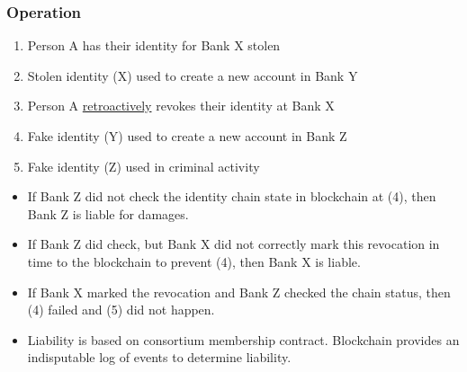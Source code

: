 \documentclass[8pt,final,xcolor={usenames,x11names}]{beamer}
\begin{document}
\begin{frame}[fragile]
\frametitle{Operation}
\begin{enumerate}
 \item Person A has their identity for \colorbox{PaleTurquoise1>wheel,1,5}{Bank X} stolen
 \item \colorbox{PaleTurquoise1>wheel,1,5}{Stolen identity (X)} used to create a new account in \colorbox{PaleTurquoise1>wheel,2,5}{Bank Y}
 \item Person A \underline{retroactively} revokes their identity at \colorbox{PaleTurquoise1>wheel,1,5}{Bank X}
 \item \colorbox{PaleTurquoise1>wheel,2,5}{Fake identity (Y)} used to create a new account in \colorbox{PaleTurquoise1}{Bank Z}
 \item \colorbox{PaleTurquoise1}{Fake identity (Z)} used in criminal activity
\end{enumerate}
\begin{itemize}
 \item If \colorbox{PaleTurquoise1}{Bank Z} did not check the identity chain state in blockchain at (4), then \colorbox{PaleTurquoise1}{Bank Z} is liable for damages.
 \item If \colorbox{PaleTurquoise1}{Bank Z} did check, but \colorbox{PaleTurquoise1>wheel,1,5}{Bank X} did not correctly mark this revocation in time to the blockchain to prevent (4), then \colorbox{PaleTurquoise1>wheel,1,5}{Bank X} is liable.
 \item If \colorbox{PaleTurquoise1>wheel,1,5}{Bank X} marked the revocation and \colorbox{PaleTurquoise1}{Bank Z} checked the chain status, then (4) failed and (5) did not happen.
 \item Liability is based on consortium membership contract. Blockchain provides an indisputable log of events to determine liability.
\end{itemize}

\end{frame}
\end{document}
